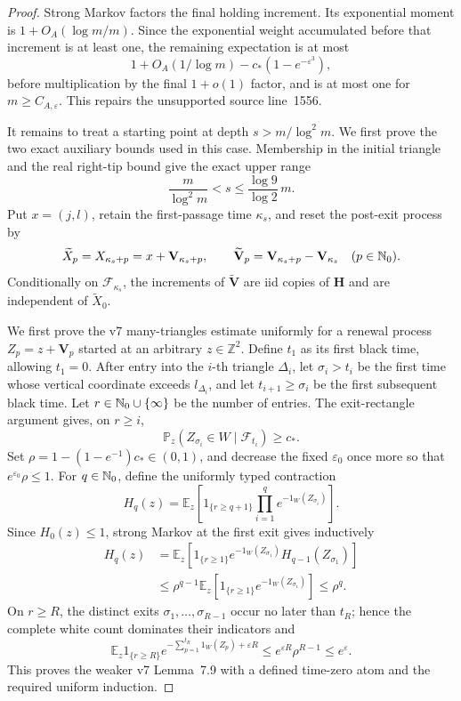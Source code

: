 \begin{proof}
Strong Markov factors the final holding increment.  Its exponential moment
is \(1+O_A(\log m/m)\).  Since the exponential weight accumulated before
that increment is at least one, the remaining expectation is at most
\[
 1+O_A(1/\log m)-c_*(1-e^{-\varepsilon^3}),
\]
before multiplication by the final \(1+o(1)\) factor, and is at most one for
\(m\ge C_{A,\varepsilon}\).  This repairs the unsupported source line~1556.

It remains to treat a starting point at depth
\(s>m/\log^2m\).  We first prove the two exact auxiliary bounds used in this
case.  Membership in the initial triangle and the real right-tip bound give
the exact upper range
\begin{equation}
\label{eq:Tao-deep-depth-upper}
 \frac m{\log^2m}<s\le\frac{\log9}{\log2}\,m.
\end{equation}
Put \(x=(j,l)\), retain the first-passage time \(\kappa_s\), and reset the
post-exit process by
\[
 \widetilde X_p=X_{\kappa_s+p}=x+\mathbf V_{\kappa_s+p},\qquad
 \widetilde{\mathbf V}_p
   =\mathbf V_{\kappa_s+p}-\mathbf V_{\kappa_s}
 \quad(p\in\mathbb{N}_{0}).
\]
Conditionally on \(\mathcal F_{\kappa_s}\), the increments of
\(\widetilde{\mathbf V}\) are iid copies of \(\mathbf H\) and are
independent of \(\widetilde X_0\).

We first prove the v7 many-triangles estimate uniformly for a renewal process
\(Z_p=z+\mathbf V_p\) started at an arbitrary \(z\in\mathbb Z^2\).  Define
\(t_1\) as its first black time, allowing \(t_1=0\).  After entry into the
\(i\)-th triangle \(\Delta_i\), let \(\sigma_i>t_i\) be the first time whose
vertical coordinate exceeds \(l_{\Delta_i}\), and let \(t_{i+1}\ge\sigma_i\)
be the first subsequent black time.  Let \(r\in\mathbb{N}_{0}\cup\{\infty\}\) be
the number of entries.  The exit-rectangle argument gives, on \(r\ge i\),
\[
 \mathbb P_z(Z_{\sigma_i}\in W\mid\mathcal F_{t_i})\ge c_*.
\]
Set \(\rho=1-(1-e^{-1})c_*\in(0,1)\), and decrease the fixed
\(\varepsilon_0\) once more so that \(e^{\varepsilon_0}\rho\le1\).  For
\(q\in\mathbb{N}_{0}\), define the uniformly typed contraction
\[
 H_q(z)=\mathbb E_z\left[
  1_{\{r\ge q+1\}}\prod_{i=1}^{q}e^{-1_W(Z_{\sigma_i})}
 \right].
\]
Since \(H_0(z)\le1\), strong Markov at the first exit gives inductively
\begin{align*}
 H_q(z)
 &=\mathbb E_z\left[
  1_{\{r\ge1\}}e^{-1_W(Z_{\sigma_1})}
  H_{q-1}(Z_{\sigma_1})\right]\\
 &\le\rho^{q-1}\mathbb E_z\left[
  1_{\{r\ge1\}}e^{-1_W(Z_{\sigma_1})}\right]
 \le\rho^q.
\end{align*}
On \(r\ge R\), the distinct exits
\(\sigma_1,\ldots,\sigma_{R-1}\) occur no later than \(t_R\); hence the
complete white count dominates their indicators and
\begin{equation}
\label{eq:Tao-v7-many-triangles-proved}
 \mathbb E_z1_{\{r\ge R\}}
 e^{-\sum_{p=1}^{t_R}1_W(Z_p)+\varepsilon R}
 \le e^{\varepsilon R}\rho^{R-1}\le e^\varepsilon.
\end{equation}
This proves the weaker v7 Lemma~7.9 with a defined time-zero atom and the
required uniform induction.


\end{proof}
